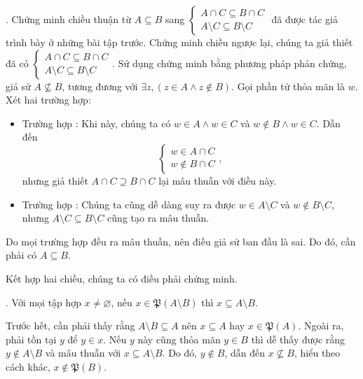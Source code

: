 . Chứng minh chiều thuận từ $A \subseteq B$ sang $\begin{cases}
   A \cap C \subseteq B \cap C \\
   A \setminus C \subseteq B \setminus C
\end{cases}$ đã được tác giả trình bày ở những bài tập trước. Chứng minh chiều ngược lại, chúng ta giả thiết đã có $\begin{cases}
   A \cap C \subseteq B \cap C \\
   A \setminus C \subseteq B \setminus C
\end{cases}$. Sử dụng chứng minh bằng phương pháp phản chứng, giả sử $A \not \subseteq B$, tương đương với $\exists z, (z \in A \land z \notin B)$. Gọi phần tử thỏa mãn là $w$. Xét hai trường hợp:
\begin{itemize}
   \item Trường hợp : Khi này, chúng ta có $w \in A \land w \in C$ và $w \notin B \land w \in C$. Dẫn đến
   \begin{equation*}
      \begin{cases}
         w \in A \cap C\\
         w \notin B \cap C
      \end{cases},
   \end{equation*} nhưng giả thiết $A \cap C \supseteq B \cap C$ lại mâu thuẫn với điều này.
   \item Trường hợp : Chúng ta cũng dễ dàng suy ra được $w \in A \setminus C$ và $w \notin B \setminus C$, nhưng $A \setminus C \subseteq B \setminus C$ cũng tạo ra mâu thuẫn.
\end{itemize}
Do mọi trường hợp đều ra mâu thuẫn, nên điều giả sử ban đầu là sai. Do đó, cần phải có $A \subseteq B$.

Kết hợp hai chiều, chúng ta có điều phải chứng minh.

. Với mọi tập hợp $x \neq \varnothing$, nếu $x \in \mathfrak{P}(A \setminus B)$ thì $x \subseteq A \setminus B$. 

Trước hết, cần phải thấy rằng $A \setminus B \subseteq A$ nên $x \subseteq A$ hay $x \in \mathfrak{P}(A)$. Ngoài ra, phải tồn tại $y$ để $y\in x$. Nếu $y$ này cũng thỏa mãn $y \in B$ thì dễ thấy được rằng $y \notin A \setminus B$ và mâu thuẫn với $x \subseteq A \setminus B$. Do đó, $y \notin B$, dẫn đến $x \not \subseteq B$, hiểu theo cách khác, $x \notin \mathfrak{P}(B)$.

